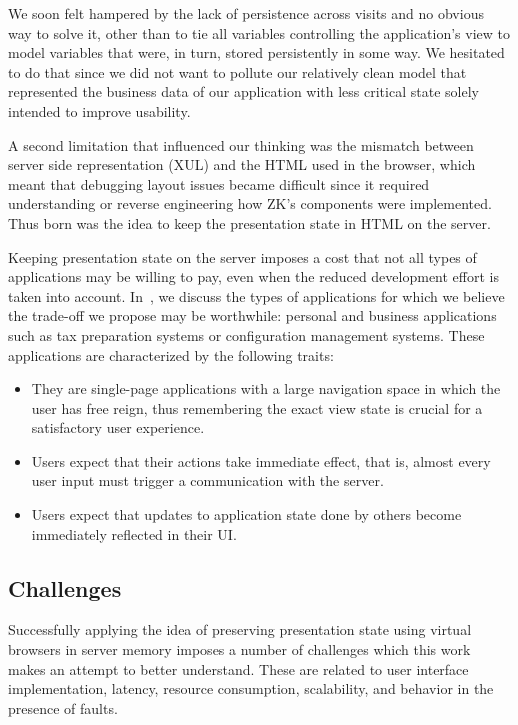 We soon felt hampered by the lack of persistence across visits and no obvious way 
to solve it, other than to tie all variables controlling the application's
view to model variables that were, in turn, stored persistently in some way.
We hesitated to do that since we did not want to pollute our relatively clean
model that represented the business data of our application with less 
critical state solely intended to improve usability.

A second limitation that influenced our thinking was the mismatch between
server side representation (XUL) and the HTML used in the browser, which meant
that debugging layout issues became difficult since it required understanding
or reverse engineering how ZK's components were implemented.
Thus born was the idea to keep the presentation state in HTML on the server.

Keeping presentation state on the server imposes a cost that not all
types of applications may be willing to pay, even when the reduced development
effort is taken into account.  In~\cite{mcdaniel2012cloudbrowser}, we 
discuss the types of applications for which we believe the trade-off we propose
may be worthwhile: personal and business applications such as tax preparation systems
or configuration management systems.  These applications are characterized by the following
traits:
\begin{itemize}
\item They are single-page applications with a large navigation space in which the
    user has free reign, thus remembering the exact view state is crucial for
    a satisfactory user experience.
\item Users expect that their actions take immediate effect, that is, almost every
    user input must trigger a communication with the server.
\item Users expect that updates to application state done by others become immediately
    reflected in their UI.
\end{itemize}

\webscaleout{}
\architectureoverview{}

\subsection{Challenges}
Successfully applying the idea of preserving presentation state using virtual
browsers in server memory imposes a number of challenges which this work 
makes an attempt to better understand.
These are related to user interface implementation, latency, 
resource consumption, scalability, and behavior in the presence of faults.

